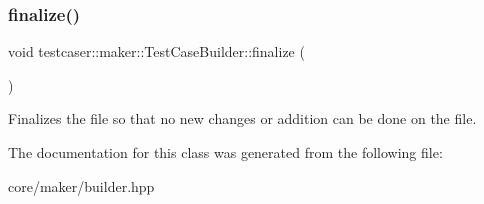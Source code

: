 \subsubsection{\texorpdfstring{finalize()}{finalize()}}
{\footnotesize\ttfamily void testcaser\+::maker\+::\+Test\+Case\+Builder\+::finalize (\begin{DoxyParamCaption}{ }\end{DoxyParamCaption})\hspace{0.3cm}{\ttfamily [inline]}}



Finalizes the file so that no new changes or addition can be done on the file. 



The documentation for this class was generated from the following file\+:\begin{DoxyCompactItemize}
\item 
core/maker/builder.\+hpp\end{DoxyCompactItemize}
